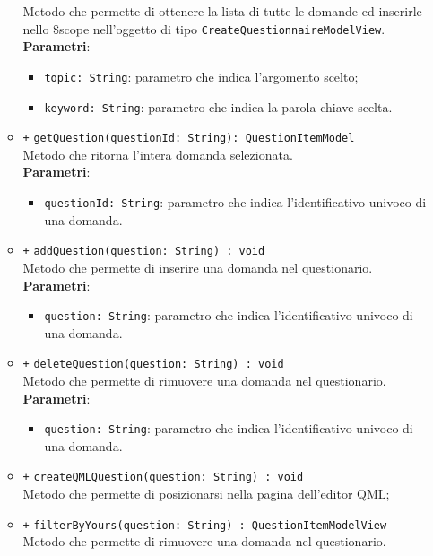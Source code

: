 \begin{itemize}
\begin{itemize}
		Metodo che permette di ottenere la lista di tutte le domande ed inserirle nello \$scope nell'oggetto di tipo \texttt{CreateQuestionnaireModelView}.\\
		\textbf{Parametri}:
		\begin{itemize}
			\item \texttt{topic: String}: parametro che indica l'argomento scelto;
			\item \texttt{keyword: String}: parametro che indica la parola chiave scelta.
		\end{itemize}
		\item \texttt{+} \texttt{getQuestion(questionId: String): QuestionItemModel} \\
		Metodo che ritorna l'intera domanda selezionata.\\
		\textbf{Parametri}:
		\begin{itemize}
			\item \texttt{questionId: String}: parametro che indica l'identificativo univoco di una domanda.
		\end{itemize}
		\item \texttt{+} \texttt{addQuestion(question: String) : void} \\
		Metodo che permette di inserire una domanda nel questionario.\\
		\textbf{Parametri}:
		\begin{itemize}
			\item \texttt{question: String}: parametro che indica l'identificativo univoco di una domanda.
		\end{itemize}
		\item \texttt{+} \texttt{deleteQuestion(question: String) : void} \\
		Metodo che permette di rimuovere una domanda nel questionario.\\
		\textbf{Parametri}:
		\begin{itemize}
			\item \texttt{question: String}: parametro che indica l'identificativo univoco di una domanda.
		\end{itemize}
		\item \texttt{+} \texttt{createQMLQuestion(question: String) : void} \\
		Metodo che permette di posizionarsi nella pagina dell'editor QML;\\
		\item \texttt{+} \texttt{filterByYours(question: String) : QuestionItemModelView} \\
		Metodo che permette di rimuovere una domanda nel questionario.\\

\end{itemize}
\end{itemize}
